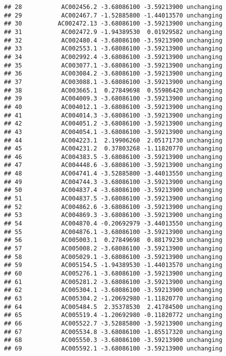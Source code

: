 \documentclass[]{article}
\begin{document}
\begin{verbatim}
## 28           AC002456.2 -3.68086100 -3.59213900 unchanging
## 29           AC002467.7 -1.52885800 -1.44013570 unchanging
## 30          AC002472.13 -3.68086100 -3.59213900 unchanging
## 31           AC002472.9 -1.94389530  0.01929582 unchanging
## 32           AC002480.4 -3.68086100 -3.59213900 unchanging
## 33           AC002553.1 -3.68086100 -3.59213900 unchanging
## 34           AC002992.4 -3.68086100 -3.59213900 unchanging
## 35           AC003077.1 -3.68086100 -3.59213900 unchanging
## 36           AC003084.2 -3.68086100 -3.59213900 unchanging
## 37           AC003088.1 -3.68086100 -3.59213900 unchanging
## 38           AC003665.1  0.27849698  0.55986420 unchanging
## 39           AC004009.3 -3.68086100 -3.59213900 unchanging
## 40           AC004012.1 -3.68086100 -3.59213900 unchanging
## 41           AC004014.3 -3.68086100 -3.59213900 unchanging
## 42           AC004051.2 -3.68086100 -3.59213900 unchanging
## 43           AC004054.1 -3.68086100 -3.59213900 unchanging
## 44           AC004223.1  2.19906260  2.05171730 unchanging
## 45           AC004231.2  0.37803268 -1.11820770 unchanging
## 46           AC004383.5 -3.68086100 -3.59213900 unchanging
## 47           AC004448.6 -3.68086100 -3.59213900 unchanging
## 48           AC004741.4 -3.52885800 -3.44013550 unchanging
## 49           AC004744.3 -3.68086100 -3.59213900 unchanging
## 50           AC004837.4 -3.68086100 -3.59213900 unchanging
## 51           AC004837.5 -3.68086100 -3.59213900 unchanging
## 52           AC004862.6 -3.68086100 -3.59213900 unchanging
## 53           AC004869.3 -3.68086100 -3.59213900 unchanging
## 54           AC004870.4 -0.20692979 -3.44013550 unchanging
## 55           AC004876.1 -3.68086100 -3.59213900 unchanging
## 56           AC005003.1  0.27849698  0.88179230 unchanging
## 57           AC005008.2 -3.68086100 -3.59213900 unchanging
## 58           AC005029.1 -3.68086100 -3.59213900 unchanging
## 59           AC005154.5 -1.94389530 -1.44013570 unchanging
## 60           AC005276.1 -3.68086100 -3.59213900 unchanging
## 61           AC005281.2 -3.68086100 -3.59213900 unchanging
## 62           AC005304.1 -3.68086100 -3.59213900 unchanging
## 63           AC005304.2 -1.20692980 -1.11820770 unchanging
## 64           AC005484.5  2.35378530  2.41784500 unchanging
## 65           AC005519.4 -1.20692980 -0.11820772 unchanging
## 66           AC005522.7 -3.52885800 -3.59213900 unchanging
## 67           AC005534.8 -3.68086100 -1.85517320 unchanging
## 68           AC005550.3 -3.68086100 -3.59213900 unchanging
## 69           AC005592.1 -3.68086100 -3.59213900 unchanging

\end{verbatim}
\end{document}
